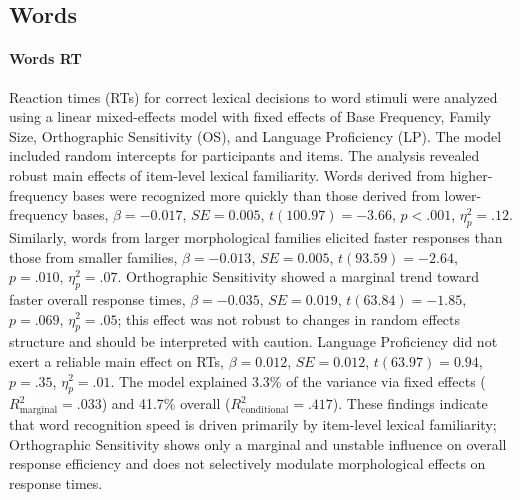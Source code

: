 \documentclass[utf8]{FrontiersinHarvard} %
\begin{document}
\subsection{Words}

\paragraph*{Words RT}
Reaction times (RTs) for correct lexical decisions to word stimuli were analyzed using a linear mixed-effects model with fixed effects of Base Frequency, Family Size, Orthographic Sensitivity (OS), and Language Proficiency (LP).  The model included random intercepts for participants and items. The analysis revealed robust main effects of item-level lexical familiarity. Words derived from higher-frequency bases were recognized more quickly than those derived from lower-frequency bases, $\beta = -0.017$, $SE = 0.005$, $t(100.97) = -3.66$, $p < .001$, $\eta^2_p = .12$. Similarly, words from larger morphological families elicited faster responses than those from smaller families, $\beta = -0.013$, $SE = 0.005$, $t(93.59) = -2.64$, $p = .010$, $\eta^2_p = .07$. Orthographic Sensitivity showed a marginal trend toward faster overall response times, $\beta = -0.035$, $SE = 0.019$, $t(63.84) = -1.85$, $p = .069$, $\eta^2_p = .05$; this effect was not robust to changes in random effects structure and should be interpreted with caution. Language Proficiency did not exert a reliable main effect on RTs, $\beta = 0.012$, $SE = 0.012$, $t(63.97) = 0.94$, $p = .35$, $\eta^2_p = .01$. The model explained 3.3\% of the variance via fixed effects ($R^2_{\mathrm{marginal}} = .033$) and 41.7\% overall ($R^2_{\mathrm{conditional}} = .417$). These findings indicate that word recognition speed is driven primarily by item-level lexical familiarity; Orthographic Sensitivity shows only a marginal and unstable influence on overall response efficiency and does not selectively modulate morphological effects on response times.
\end{document}
